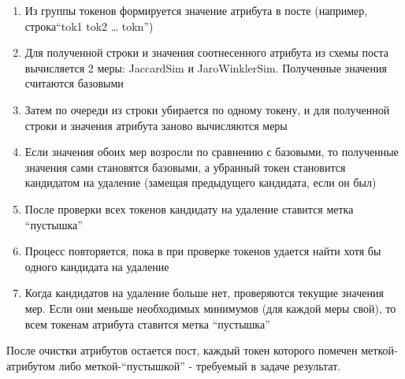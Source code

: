 \begin{enumerate}
	\item Из группы токенов формируется значение атрибута в посте (например, строка``tok1 tok2 … tokn'')
	\item Для полученной строки и значения соотнесенного атрибута из схемы поста вычисляется 2 меры: JaccardSim и JaroWinklerSim. Полученные значения считаются базовыми
	\item Затем по очереди из строки убирается по одному токену, и для полученной строки и значения атрибута заново вычисляются меры
	\item Если значения обоих мер возросли по сравнению с базовыми, то полученные значения сами становятся базовыми, а убранный токен становится кандидатом на удаление (замещая предыдущего кандидата, если он был)
	\item После проверки всех токенов кандидату на удаление ставится метка ``пустышка''
	\item Процесс повторяется, пока в при проверке токенов удается найти хотя бы одного кандидата на удаление
	\item Когда кандидатов на удаление больше нет, проверяются текущие значения мер. Если они меньше необходимых минимумов (для каждой меры свой), то всем токенам атрибута ставится метка ``пустышка''
\end{enumerate}

После очистки атрибутов остается пост, каждый токен которого помечен меткой-атрибутом либо меткой-``пустышкой'' - требуемый в задаче результат.
